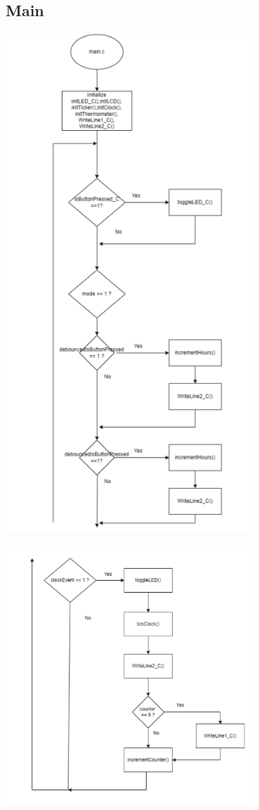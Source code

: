 \documentclass[a4paper,12pt]{article}
\begin{document}
\subsection{Main}
\begin{center}
    \includegraphics[width=0.7\textwidth]{diagrams/flowChart1.png}
\end{center}

\clearpage

\begin{center}
    \hspace{2cm}
    \includegraphics[width=0.7\textwidth]{diagrams/flowChart2.png}
\end{center}
\end{document}
